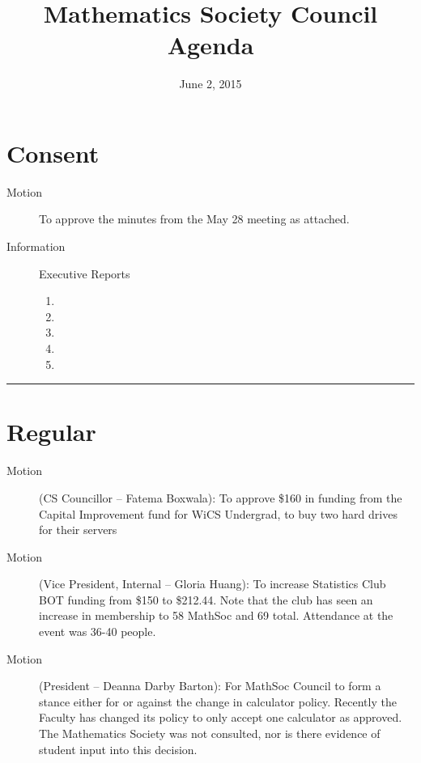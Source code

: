 \documentclass[12pt,letterpaper]{article}
\title{Mathematics Society Council Agenda}
\date{June 2, 2015}
\newcommand{\HRule}{\rule{\linewidth}{0.4mm}}
\begin{document}
\hypersetup{}




\section*{Consent}
\begin{description}
	\item[Motion] To approve the minutes from the May 28 meeting as attached.
	\item[Information] Executive Reports
	\begin{enumerate}
		\item {}
		\item {}
		\item {}
		\item {}
		\item {}
	\end{enumerate}
\end{description}
\HRule
\section*{Regular}
\begin{description}
	\item[Motion] (CS Councillor – Fatema Boxwala): To approve \$160 in funding from the Capital Improvement fund for WiCS Undergrad, to buy two hard drives for their servers
	\item[Motion] (Vice President, Internal – Gloria Huang): To increase Statistics Club BOT funding from \$150 to \$212.44. Note that the club has seen an increase in membership to 58 MathSoc and 69 total. Attendance at the event was 36-40 people.
	\item[Motion] (President – Deanna Darby Barton): For MathSoc Council to form a stance either for or against the change in calculator policy. 
Recently the Faculty has changed its policy to only accept one calculator as approved. The Mathematics Society was not consulted, nor is there evidence of student input into this decision.
\end{description}

\newpage


\end{document}
